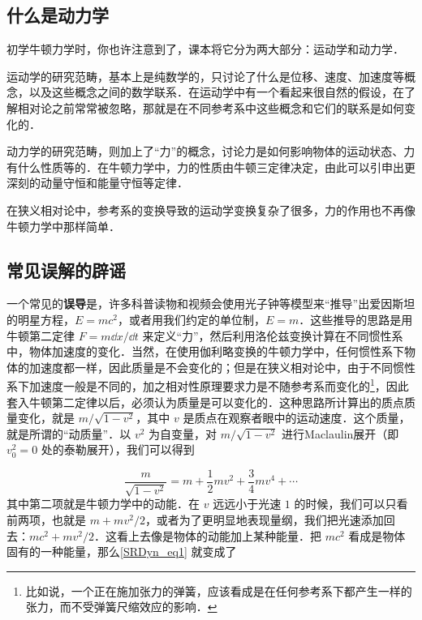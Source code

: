

\subsection{什么是动力学}
初学牛顿力学时，你也许注意到了，课本将它分为两大部分：运动学和动力学．

运动学的研究范畴，基本上是纯数学的，只讨论了什么是位移、速度、加速度等概念，以及这些概念之间的数学联系．在运动学中有一个看起来很自然的假设，在了解相对论之前常常被忽略，那就是在不同参考系中这些概念和它们的联系是如何变化的．

动力学的研究范畴，则加上了“力”的概念，讨论力是如何影响物体的运动状态、力有什么性质等的．在牛顿力学中，力的性质由牛顿三定律决定，由此可以引申出更深刻的动量守恒和能量守恒等定律．

在狭义相对论中，参考系的变换导致的运动学变换复杂了很多，力的作用也不再像牛顿力学中那样简单．

\subsection{常见误解的辟谣}
一个常见的\textbf{误导}是，许多科普读物和视频会使用光子钟等模型来“推导”出爱因斯坦的明星方程，$E=mc^2$，或者用我们约定的单位制，$E=m$．这些推导的思路是用牛顿第二定律 $F=m\dd x/\dd t$ 来定义“力”，然后利用洛伦兹变换计算在不同惯性系中，物体加速度的变化．当然，在使用伽利略变换的牛顿力学中，任何惯性系下物体的加速度都一样，因此质量是不会变化的；但是在狭义相对论中，由于不同惯性系下加速度一般是不同的，加之相对性原理要求力是不随参考系而变化的\footnote{比如说，一个正在施加张力的弹簧，应该看成是在任何参考系下都产生一样的张力，而不受弹簧尺缩效应的影响．}，因此套入牛顿第二定律以后，必须认为质量是可以变化的．这种思路所计算出的质点质量变化，就是 $m/\sqrt{1-v^2}$，其中 $v$ 是质点在观察者眼中的运动速度．这个质量，就是所谓的“动质量”．以 $v^2$ 为自变量，对 $m/\sqrt{1-v^2}$ 进行Maclaulin展开（即 $v_0^2=0$ 处的泰勒展开），我们可以得到

\begin{equation}\label{SRDyn_eq1}
\frac{m}{\sqrt{1-v^2}}=m+\frac{1}{2}mv^2+\frac{3}{4}mv^4+\cdots
\end{equation}
其中第二项就是牛顿力学中的动能．在 $v$ 远远小于光速 $1$ 的时候，我们可以只看前两项，也就是 $m+mv^2/2$，或者为了更明显地表现量纲，我们把光速添加回去：$mc^2+mv^2/2$．这看上去像是物体的动能加上某种能量．把 $mc^2$ 看成是物体固有的一种能量，那么\autoref{SRDyn_eq1} 就变成了

